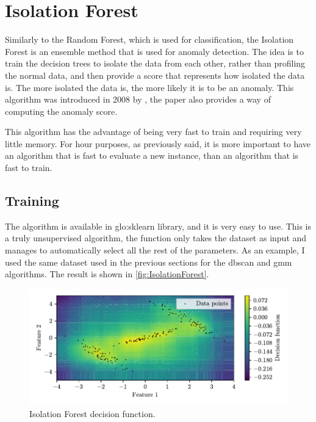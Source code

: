 \section{Isolation Forest}
\label{sec:IsolationForest}

Similarly to the Random Forest, which is used for classification, the Isolation Forest is an ensemble method that is used for anomaly detection. The idea is to train the decision trees to isolate the data from each other, rather than profiling the normal data, and then provide a score that represents how isolated the data is. The more isolated the data is, the more likely it is to be an anomaly. This algorithm was introduced in 2008 by \cite{iforest}, the paper also provides a way of computing the anomaly score.

This algorithm has the advantage of being very fast to train and requiring very little memory. For hour purposes, as previously said, it is more important to have an algorithm that is fast to evaluate a new instance, than an algorithm that is fast to train.

\subsection{Training}
The algorithm is available in \gls{glo:sklearn} library, and it is very easy to use. This is a truly unsupervised algorithm, the function only takes the dataset as input and manages to automatically select all the rest of the parameters. As an example, I used the same dataset used in the previous sections for the \gls{dbscan} and {\gls{gmm}} algorithms. The result is shown in \autoref{fig:IsolationForest}.

\begin{figure}
    \centering
    \includegraphics{images/IForest/Figure_1.pdf}
    \caption{Isolation Forest decision function.}
    \label{fig:IsolationForest}
\end{figure}

